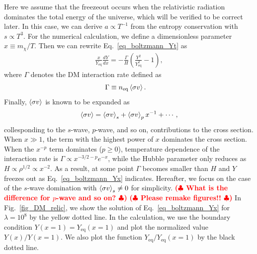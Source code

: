 \documentclass[12pt,twoside,book]{article}
\def\rem#1{ {\bf\textcolor{red}{($\clubsuit$ #1 $\clubsuit$)}}}
\begin{document}
Here we assume that the freezeout occurs when the relativistic radiation
dominates the total energy of the universe, which will be verified to be
correct later.  In this case, we can derive $a \propto T^{-1}$ from the
entropy conservation with $s \propto T^3$.  For the numerical
calculation, we define a dimensionless parameter $x \equiv m_\chi / T$.
Then we can rewrite Eq.~\eqref{eq_boltzmann_Yt} as
\begin{align}
 \frac{x}{Y_{\mathrm{eq}}} \frac{d Y}{d x} =
 -\frac{\Gamma}{H} \left( \frac{Y^2}{Y_{\mathrm{eq}}^2} - 1 \right),\label{eq_boltzmann_Yx}
\end{align}
where $\Gamma$ denotes the DM interaction rate defined as
\begin{align}
 \Gamma &\equiv n_{\mathrm{eq}} \Braket{\sigma v}.\label{eq_lambda}
\end{align}
Finally, $\Braket{\sigma v}$ is known to be expanded
as~\cite{Gondolo:1990dk}
\begin{align}
 \Braket{\sigma v} = \Braket{\sigma v}_s +
 \Braket{\sigma v}_p x^{-1} + \cdots,
\end{align}
collesponding to the $s$-wave, $p$-wave, and so on, contributions to the
cross section.  When $x \gg 1$, the term with the highest power of $x$
dominates the cross section.  When the $x^{-p}$ term dominates ($p \geq
0$), temperature dependence of the interaction rate is $\Gamma \propto
x^{-3/2-p} e^{-x}$, while the Hubble parameter only reduces as $H
\propto \rho^{1/2} \propto x^{-2}$.  As a result, at some point $\Gamma$
becomes smaller than $H$ and $Y$ freezes out as
Eq.~\eqref{eq_boltzmann_Yx} indicates.  Hereafter, we focus on the case
of the $s$-wave domination with $\Braket{\sigma v}_s \neq 0$ for
simplicity.  \rem{What is the difference for $p$-wave and so on?}
\rem{Please remake figures!!}  In Fig.~\ref{fig_DM_relic}, we show the
solution of Eq.~\eqref{eq_boltzmann_Yx} for $\lambda = 10^8$ by the
yellow dotted line.  In the calculation, we use the boundary condition
$Y(x=1) = Y_{\mathrm{eq}} (x=1)$ and plot the normalized value $Y(x) /
Y(x=1)$.  We also plot the function $Y_{\mathrm{eq}} / Y_{\mathrm{eq}}
(x=1)$ by the black dotted line.
\end{document}

